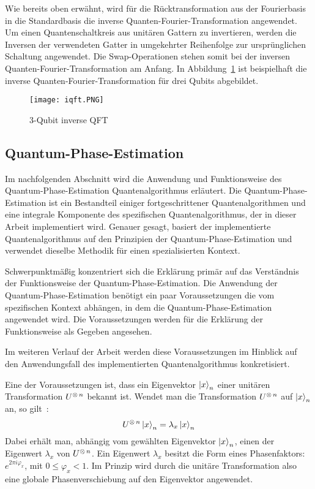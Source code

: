 Wie bereits oben erwähnt, 
wird für die Rücktransformation aus der Fourierbasis in die Standardbasis die inverse Quanten-Fourier-Transformation angewendet.
Um einen Quantenschaltkreis aus unitären Gattern zu invertieren, 
werden die Inversen der verwendeten Gatter in umgekehrter Reihenfolge zur ursprünglichen Schaltung angewendet. 
Die Swap-Operationen stehen somit bei der inversen Quanten-Fourier-Transformation am Anfang.
In Abbildung~\ref{fig:iqft} ist beispielhaft die inverse Quanten-Fourier-Transformation für drei Qubits abgebildet.
\begin{figure}[H]
  \centering
  \texttt{[image: iqft.PNG]}
  \caption{3-Qubit inverse QFT}
  \label{fig:iqft}
\end{figure}

\subsection{Quantum-Phase-Estimation} \label{Quanten-Phase-Estimation}

Im nachfolgenden Abschnitt wird die Anwendung und Funktionsweise des Quantum-Phase-Estimation Quantenalgorithmus erläutert. 
Die Quantum-Phase-Estimation ist ein Bestandteil einiger fortgeschrittener Quantenalgorithmen und eine integrale Komponente des spezifischen Quantenalgorithmus, 
der in dieser Arbeit implementiert wird. 
Genauer gesagt, 
basiert der implementierte Quantenalgorithmus auf den Prinzipien der Quantum-Phase-Estimation und verwendet dieselbe Methodik für einen spezialisierten Kontext.

Schwerpunktmäßig konzentriert sich die Erklärung primär auf das Verständnis der Funktionsweise der Quantum-Phase-Estimation.
Die Anwendung der Quantum-Phase-Estimation benötigt ein paar Voraussetzungen die vom spezifischen Kontext abhängen, 
in dem die Quantum-Phase-Estimation angewendet wird.
Die Voraussetzungen werden für die Erklärung der Funktionsweise als Gegeben angesehen.

Im weiteren Verlauf der Arbeit werden diese Voraussetzungen im Hinblick auf den Anwendungsfall des implementierten Quantenalgorithmus konkretisiert.

Eine der Voraussetzungen ist, 
dass ein Eigenvektor \(\ket{x}_n\) einer unitären Transformation \(U^{\operatorname{\otimes} n}\) bekannt ist.
Wendet man die Transformation \(U^{\operatorname{\otimes} n}\) auf \(\ket{x}_n\) an, 
so gilt~\cite[221]{nielsen_chuang_2010}: 
\[U^{\operatorname{\otimes} n}\ket{x}_n=\lambda_x\ket{x}_n\]
Dabei erhält man, abhängig vom gewählten Eigenvektor \(\ket{x}_n\), einen der Eigenwert \(\lambda_x\) von \(U^{\operatorname{\otimes} n}\).
Ein Eigenwert \(\lambda_x\) besitzt die Form eines Phasenfaktors: \(e^{2\pi i \varphi_x}\),
mit \(0 \leq \varphi_x < 1\).
Im Prinzip wird durch die unitäre Transformation also eine globale Phasenverschiebung auf den Eigenvektor angewendet.


